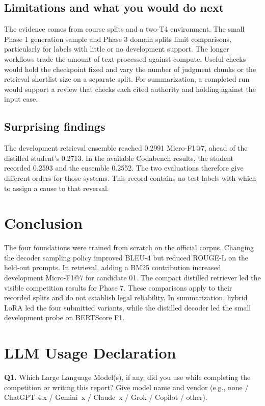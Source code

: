 \documentclass[11pt, oneside]{article}
\begin{document}
\subsection{Limitations and what you would do next}

The evidence comes from course splits and a two-T4 environment. The small Phase 1 generation sample and Phase 3 domain splits limit comparisons, particularly for labels with little or no development support. The longer workflows trade the amount of text processed against compute. Useful checks would hold the checkpoint fixed and vary the number of judgment chunks or the retrieval shortlist size on a separate split. For summarization, a completed run would support a review that checks each cited authority and holding against the input case.

\subsection{Surprising findings}

The development retrieval ensemble reached 0.2991 Micro-F1@7, ahead of the distilled student's 0.2713. In the available Codabench results, the student recorded 0.2593 and the ensemble 0.2552. The two evaluations therefore give different orders for those systems. This record contains no test labels with which to assign a cause to that reversal.

\section{Conclusion}

The four foundations were trained from scratch on the official corpus. Changing the decoder sampling policy improved BLEU-4 but reduced ROUGE-L on the held-out prompts. In retrieval, adding a BM25 contribution increased development Micro-F1@7 for candidate 01. The compact distilled retriever led the visible competition results for Phase 7. These comparisons apply to their recorded splits and do not establish legal reliability. In summarization, hybrid LoRA led the four submitted variants, while the distilled decoder led the small development probe on BERTScore F1.

\clearpage
\section*{LLM Usage Declaration}

\textbf{Q1.} Which Large Language Model(s), if any, did you use while completing the competition or writing this report? Give model name and vendor (e.g., none / ChatGPT-4.x / Gemini~x / Claude~x / Grok / Copilot / other).
\end{document}
